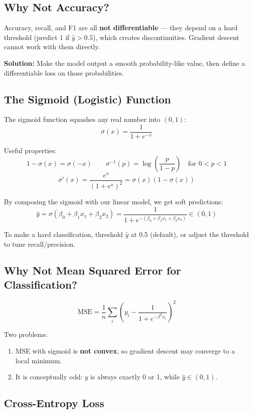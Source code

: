 \documentclass[12pt]{article}
\begin{document}
\subsection{Why Not Accuracy?}

Accuracy, recall, and F1 are all \textbf{not differentiable} --- they depend on a hard threshold (predict 1 if $\hat{y} > 0.5$), which creates discontinuities. Gradient descent cannot work with them directly.

\textbf{Solution:} Make the model output a smooth probability-like value, then define a differentiable loss on those probabilities.

\subsection{The Sigmoid (Logistic) Function}

The sigmoid function squashes any real number into $(0, 1)$:
\[
\sigma(x) = \frac{1}{1+e^{-x}}
\]

Useful properties:
\[
1 - \sigma(x) = \sigma(-x) \qquad \sigma^{-1}(p) = \log\!\left(\frac{p}{1-p}\right) \quad \text{for } 0 < p < 1
\]
\[
\sigma'(x) = \frac{e^x}{(1+e^x)^2} = \sigma(x)(1-\sigma(x))
\]

By composing the sigmoid with our linear model, we get soft predictions:
\[
\hat{y} = \sigma(\beta_0 + \beta_1 x_1 + \beta_2 x_2) = \frac{1}{1 + e^{-(\beta_0 + \beta_1 x_1 + \beta_2 x_2)}} \in (0,1)
\]

To make a hard classification, threshold $\hat{y}$ at 0.5 (default), or adjust the threshold to tune recall/precision.

\subsection{Why Not Mean Squared Error for Classification?}

\[
\text{MSE} = \frac{1}{n}\sum_i\left(y_i - \frac{1}{1+e^{-\beta^T x_i}}\right)^2
\]

Two problems:
\begin{enumerate}
  \item MSE with sigmoid is \textbf{not convex}, so gradient descent may converge to a local minimum.
  \item It is conceptually odd: $y$ is always exactly 0 or 1, while $\hat{y} \in (0,1)$.
\end{enumerate}

\subsection{Cross-Entropy Loss}
\end{document}
